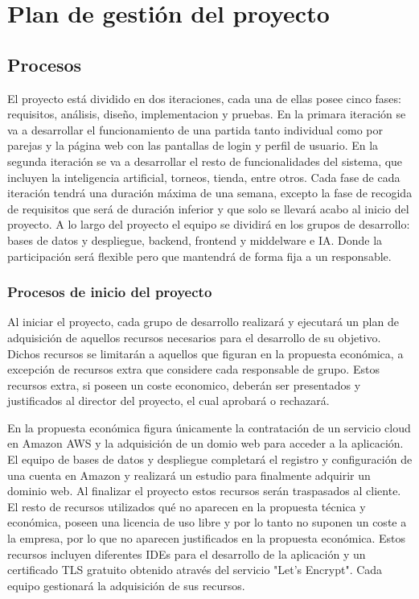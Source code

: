 \section{Plan de gestión del proyecto}
\label{planes}
\subsection{Procesos}
\label{procesos}

El proyecto está dividido en dos iteraciones, cada una de ellas posee cinco fases: requisitos, análisis, diseño, implementacion y pruebas. En la primara iteración se va a desarrollar el funcionamiento de una partida tanto individual como por parejas y la página web con las pantallas de login y perfil de usuario. En la segunda iteración se va a desarrollar el resto de funcionalidades del sistema, que incluyen la inteligencia artificial, torneos, tienda, entre otros.  Cada fase de cada iteración tendrá una duración máxima de una semana, excepto la fase de recogida de requisitos que será de duración inferior y que solo se llevará acabo al inicio del proyecto.
A lo largo del proyecto el equipo se dividirá en los grupos de desarrollo: bases de datos y despliegue, backend, frontend y middelware e IA. Donde la participación será flexible pero que mantendrá de forma fija a un responsable.

\subsubsection{Procesos de inicio del proyecto}
\label{inicio}

Al iniciar el proyecto, cada grupo de desarrollo realizará y ejecutará un plan de adquisición de aquellos recursos necesarios para el desarrollo de su objetivo. Dichos recursos se limitarán a aquellos que figuran en la propuesta económica, a excepción de recursos extra que considere cada responsable de grupo. Estos recursos extra, si poseen un coste economico, deberán ser presentados y justificados al director del proyecto, el cual aprobará o rechazará.

En la propuesta económica figura únicamente la contratación de un servicio cloud en Amazon AWS y la adquisición de un domio web para acceder a la aplicación. El equipo de bases de datos y despliegue completará el registro y configuración de una cuenta en Amazon y realizará un estudio para finalmente adquirir un dominio web. Al finalizar el proyecto estos recursos serán traspasados al cliente. El resto de recursos utilizados qué no aparecen en la propuesta técnica y económica, poseen una licencia de uso libre y por lo tanto no suponen un coste a la empresa, por lo que no aparecen justificados en la propuesta económica. Estos recursos incluyen diferentes IDEs para el desarrollo de la aplicación y un certificado TLS gratuito obtenido através del servicio "Let's Encrypt". Cada equipo gestionará la adquisición de sus recursos.

